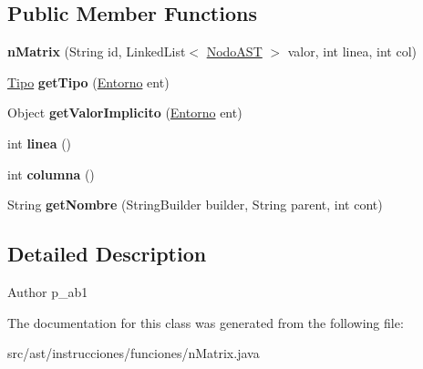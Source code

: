\subsection*{Public Member Functions}
\begin{DoxyCompactItemize}
\item 
\mbox{\label{classast_1_1instrucciones_1_1funciones_1_1n_matrix_a45a255f176702d226a85f0159219883f}} 
{\bfseries n\+Matrix} (String id, Linked\+List$<$ \mbox{\hyperlink{interfaceast_1_1_nodo_a_s_t}{Nodo\+A\+ST}} $>$ valor, int linea, int col)
\item 
\mbox{\label{classast_1_1instrucciones_1_1funciones_1_1n_matrix_a6ff5c31931e30db663e0a5d9202c8eca}} 
\mbox{\hyperlink{classentorno_1_1_tipo}{Tipo}} {\bfseries get\+Tipo} (\mbox{\hyperlink{classentorno_1_1_entorno}{Entorno}} ent)
\item 
\mbox{\label{classast_1_1instrucciones_1_1funciones_1_1n_matrix_a080b12aa8b0269e80f6d998f082ff50f}} 
Object {\bfseries get\+Valor\+Implicito} (\mbox{\hyperlink{classentorno_1_1_entorno}{Entorno}} ent)
\item 
\mbox{\label{classast_1_1instrucciones_1_1funciones_1_1n_matrix_afd37b860aef9e8320b956b9a22d854a7}} 
int {\bfseries linea} ()
\item 
\mbox{\label{classast_1_1instrucciones_1_1funciones_1_1n_matrix_ab0320d0e05a73f73b4371621817d120d}} 
int {\bfseries columna} ()
\item 
\mbox{\label{classast_1_1instrucciones_1_1funciones_1_1n_matrix_ad972429964b6bc38948d970674001f39}} 
String {\bfseries get\+Nombre} (String\+Builder builder, String parent, int cont)
\end{DoxyCompactItemize}


\subsection{Detailed Description}
\begin{DoxyAuthor}{Author}
p\+\_\+ab1 
\end{DoxyAuthor}


The documentation for this class was generated from the following file\+:\begin{DoxyCompactItemize}
\item 
src/ast/instrucciones/funciones/n\+Matrix.\+java\end{DoxyCompactItemize}
